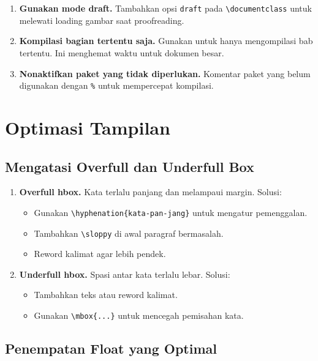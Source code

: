 \begin{enumerate}
  \item \textbf{Gunakan mode draft.} Tambahkan opsi \verb|draft| pada \verb|\documentclass| untuk melewati loading gambar saat proofreading.

  \item \textbf{Kompilasi bagian tertentu saja.} Gunakan \verb|| untuk hanya mengompilasi bab tertentu. Ini menghemat waktu untuk dokumen besar.

  \item \textbf{Nonaktifkan paket yang tidak diperlukan.} Komentar paket yang belum digunakan dengan \verb|%| untuk mempercepat kompilasi.
\end{enumerate}

\section{Optimasi Tampilan}

\subsection{Mengatasi Overfull dan Underfull Box}

\begin{enumerate}
  \item \textbf{Overfull hbox.} Kata terlalu panjang dan melampaui margin. Solusi:
  \begin{itemize}
    \item Gunakan \verb|\hyphenation{kata-pan-jang}| untuk mengatur pemenggalan.
    \item Tambahkan \verb|\sloppy| di awal paragraf bermasalah.
    \item Reword kalimat agar lebih pendek.
  \end{itemize}

  \item \textbf{Underfull hbox.} Spasi antar kata terlalu lebar. Solusi:
  \begin{itemize}
    \item Tambahkan teks atau reword kalimat.
    \item Gunakan \verb|\mbox{...}| untuk mencegah pemisahan kata.
  \end{itemize}
\end{enumerate}

\subsection{Penempatan Float yang Optimal}

